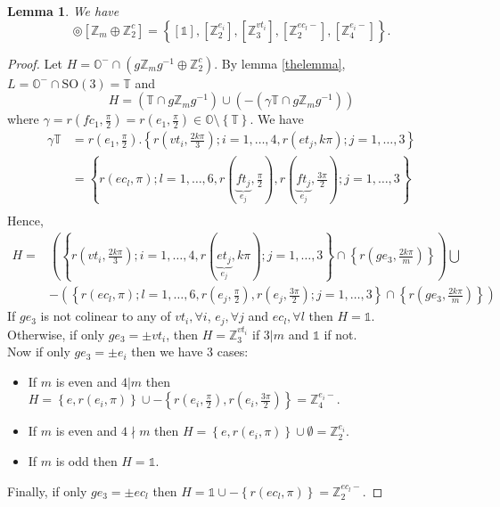 \documentclass[11pt,a4paper]{amsart}
\newtheorem{lem}[thm]{Lemma}
\theoremstyle{definition}
\newcommand{\ZZ}{\mathbb{Z}}                %
\newcommand{\SO}{\mathrm{SO}}               %
\newcommand{\octa}{\mathbb{O}}              %
\newcommand{\tetra}{\mathbb{T}}             %
\newcommand{\1}{\mathds{1}}		            %
\newcommand{\set}[1]{\left\{#1\right\}}     %
\begin{document}
\begin{lem}
We have
\begin{equation*}
[\octa^-] \circledcirc [\ZZ_m \oplus \ZZ_2^c]=\set{[\1],[\ZZ_{2}^{e_i}],[\ZZ_3^{vt_i}],[\ZZ_{2}^{ec_l-}],[\ZZ_4^{e_i-}]}.
\end{equation*}
\end{lem}
\begin{proof}
Let $H=\octa^-\cap (g\ZZ_m g^{-1} \oplus \ZZ_2^c)$.
By lemma \ref{thelemma}, $L=\octa^-\cap \SO(3)=\tetra$ and
\begin{equation*}
H=(\tetra\cap g \ZZ_m g^{-1})\cup (-(\gamma\tetra\cap g \ZZ_m g^{-1}))
\end{equation*}
where $\gamma=r(fc_1,\frac{\pi}{2})=r(e_1,\frac{\pi}{2})\in \octa\setminus\set{\tetra}$.
We have
\begin{align*}
\gamma \tetra &=r(e_1,\frac{\pi}{2}).\set{r(vt_i,\frac{2k\pi}{3});i=1,\dotsc,4,r(et_j,k\pi);j=1,\dotsc,3}\\
&=\set{r(ec_l,\pi);l=1,\dotsc,6,r(\underbrace{ft_j}_{e_j},\frac{\pi}{2}),r(\underbrace{ft_j}_{e_j},\frac{3\pi}{2});j=1,\dotsc,3}\\
\end{align*}
Hence,
\begin{align*}
H=&\left(\set{r(vt_i,\frac{2k\pi}{3});i=1,\dotsc,4,r(\underbrace{et_j}_{e_j},k\pi);j=1,\dotsc,3}\cap \set{r(ge_3,\frac{2k\pi}{m})}\right)\bigcup\\
  &-\left(\set{r(ec_l,\pi);l=1,\dotsc,6,r(e_j,\frac{\pi}{2}),r(e_j,\frac{3\pi}{2});j=1,\dotsc,3}\cap \set{r(ge_3,\frac{2k\pi}{m})}\right)
\end{align*}
If $ge_3$ is not colinear to any of $vt_i, \forall i$, $e_j,\forall j$ and $ec_l,\forall l$ then $H=\1$.\\
Otherwise, if only $ge_3=\pm vt_i$, then $H=\ZZ_3^{vt_i}$ if $3|m$ and $\1$ if not.\\
Now if only $ge_3=\pm e_i$ then we have 3 cases:
\begin{itemize}
\item If $m$ is even and $4|m$ then $H= \set{e,r(e_i,\pi)}\cup-\set{r(e_i,\frac{\pi}{2}),r(e_i,\frac{3\pi}{2})}=\ZZ_4^{e_i-}$.
\item If $m$ is even and $4\nmid m$ then $H= \set{e,r(e_i,\pi)}\cup\emptyset=\ZZ_2^{e_i}$.
\item If $m$ is odd then $H= \1$.
\end{itemize}
Finally, if only $ge_3=\pm ec_l$ then $H=\1\cup -\set{r(ec_l,\pi)}=\ZZ_2^{ec_l-}$.
\end{proof}
\end{document}
